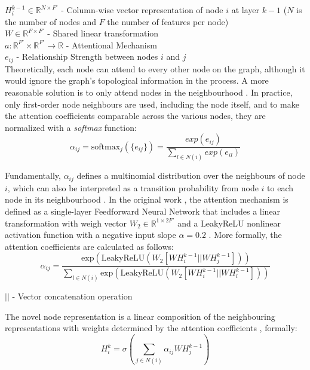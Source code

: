 $H^{k - 1}_i \in \mathbb{R}^{N \times F'}$ - Column-wise vector representation of node $i$ at layer $k - 1$ ($N$ is the number of nodes and $F$ the number of features per node) \\
$W \in \mathbb{R}^{F \times F'}$ - Shared linear transformation \\
$a: \mathbb{R}^{F'} \times \mathbb{R}^{F'} \rightarrow \mathbb{R}$ - Attentional Mechanism \\
$e_{ij}$ - Relationship Strength between nodes $i$ and $j$ \\

Theoretically, each node can attend to every other node on the graph, although it would ignore the graph's topological information in the process. A more reasonable solution is to only attend nodes in the neighbourhood \cite{velickovicGraphAttentionNetworks2018, tangGraphNeuralNetworks2022}. In practice, only first-order node neighbours are used, including the node itself, and to make the attention coefficients comparable across the various nodes, they are normalized with a \textit{softmax} function:
$$ \alpha_{ij} = \text{softmax}_j(\{e_{ij}\}) = \frac{exp(e_{ij})}{\sum_{l \in N(i)} exp(e_{il})}$$

Fundamentally, $\alpha_{ij}$ defines a multinomial distribution over the neighbours of node $i$, which can also be interpreted as a transition probability from node $i$ to each node in its neighbourhood \cite{tangGraphNeuralNetworks2022}. 
In the original work \cite{velickovicGraphAttentionNetworks2018}, the attention mechanism is defined as a single-layer Feedforward Neural Network that includes a linear transformation with weigh vector $W_2 \in \mathbb{R}^{1 \times 2 F'}$ and a LeakyReLU nonlinear activation function with a negative input slope $\alpha = 0.2$ \cite{tangGraphNeuralNetworks2022, velickovicGraphAttentionNetworks2018}. More formally, the attention coefficients are calculated as follows:
\begin{equation}
	\alpha_{ij} = \frac{ \text{exp}( \text{LeakyReLU}( W_2 [W H^{k - 1}_i || W H^{k - 1}_j]))}{ \sum_{l \in N(i)} \text{exp}( \text{LeakyReLU}( W_2 [W H^{k - 1}_i || W H^{k - 1}_l])) }
\end{equation}

$||$ - Vector concatenation operation

The novel node representation is a linear composition of the neighbouring representations with weights determined by the attention coefficients \cite{velickovicGraphAttentionNetworks2018, tangGraphNeuralNetworks2022}, formally:
\begin{equation}
	H^k_i = \sigma(\sum_{j \in N(i)} \alpha_{ij} W H^{k - 1}_j) 
\end{equation}


